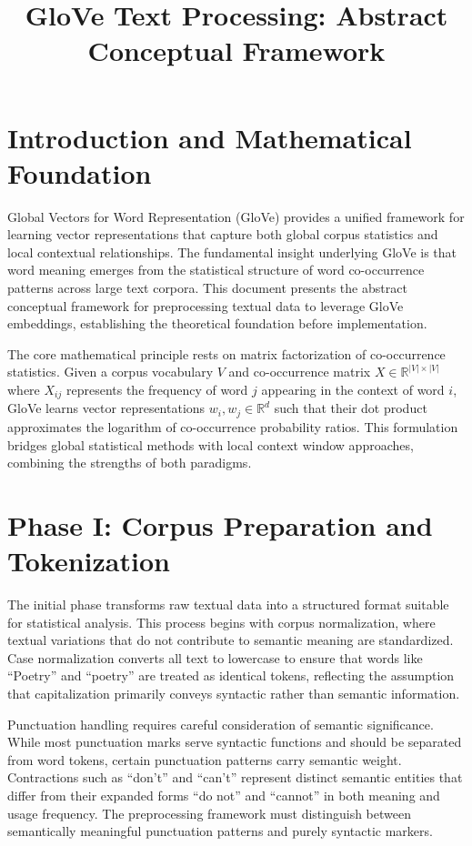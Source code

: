 \documentclass[11pt,a4paper]{article}
\title{GloVe Text Processing: Abstract Conceptual Framework}
\author{}
\date{}
\begin{document}
\maketitle

\section{Introduction and Mathematical Foundation}

Global Vectors for Word Representation (GloVe) provides a unified framework for learning vector representations that capture both global corpus statistics and local contextual relationships. The fundamental insight underlying GloVe is that word meaning emerges from the statistical structure of word co-occurrence patterns across large text corpora. This document presents the abstract conceptual framework for preprocessing textual data to leverage GloVe embeddings, establishing the theoretical foundation before implementation.

The core mathematical principle rests on matrix factorization of co-occurrence statistics. Given a corpus vocabulary $V$ and co-occurrence matrix $X \in \mathbb{R}^{|V| \times |V|}$ where $X_{ij}$ represents the frequency of word $j$ appearing in the context of word $i$, GloVe learns vector representations $w_i, w_j \in \mathbb{R}^d$ such that their dot product approximates the logarithm of co-occurrence probability ratios. This formulation bridges global statistical methods with local context window approaches, combining the strengths of both paradigms.

\section{Phase I: Corpus Preparation and Tokenization}

The initial phase transforms raw textual data into a structured format suitable for statistical analysis. This process begins with corpus normalization, where textual variations that do not contribute to semantic meaning are standardized. Case normalization converts all text to lowercase to ensure that words like ``Poetry'' and ``poetry'' are treated as identical tokens, reflecting the assumption that capitalization primarily conveys syntactic rather than semantic information.

Punctuation handling requires careful consideration of semantic significance. While most punctuation marks serve syntactic functions and should be separated from word tokens, certain punctuation patterns carry semantic weight. Contractions such as ``don't'' and ``can't'' represent distinct semantic entities that differ from their expanded forms ``do not'' and ``cannot'' in both meaning and usage frequency. The preprocessing framework must distinguish between semantically meaningful punctuation patterns and purely syntactic markers.
\end{document}
